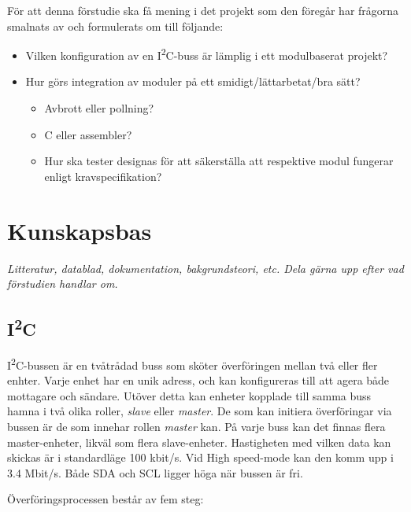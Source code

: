 \documentclass[11pt]{article}
\begin{document}
\begin{flushleft}
För att denna förstudie ska få mening i det projekt som den föregår har frågorna smalnats av och formulerats om till följande:

\begin{itemize}
	\item Vilken konfiguration av en I\textsuperscript{2}C-buss är lämplig i ett modulbaserat projekt?
	\item Hur görs integration av moduler på ett smidigt/lättarbetat/bra sätt?
	
		\begin{itemize}
			\item Avbrott eller pollning?
			\item C eller assembler?
			\item Hur ska tester designas för att säkerställa att respektive modul fungerar enligt kravspecifikation?
		\end{itemize}

\end{itemize}

\pagebreak

\section{Kunskapsbas}
\textit{Litteratur, datablad, dokumentation, bakgrundsteori, etc. Dela gärna upp efter vad förstudien handlar om.}

\subsection{I\textsuperscript{2}C}

I\textsuperscript{2}C-bussen är en tvåtrådad buss som sköter överföringen mellan två eller fler enhter. Varje enhet har en unik adress, och kan konfigureras till att agera både mottagare och sändare. Utöver detta kan enheter kopplade till samma buss hamna i två olika roller, \textit{slave} eller \textit{master}. De som kan initiera överföringar via bussen är de som innehar rollen \textit{master} kan. På varje buss kan det finnas flera master-enheter, likväl som flera slave-enheter. Hastigheten med vilken data kan skickas är i standardläge 100 kbit/s. Vid High speed-mode kan den komm upp i 3.4 Mbit/s. Både SDA och SCL ligger höga när bussen är fri.

Överföringsprocessen består av fem steg: 


\end{flushleft}
\end{document}
